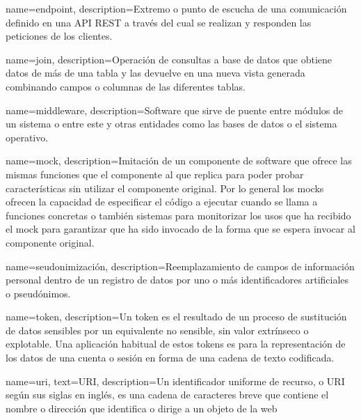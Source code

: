 {
    name=endpoint,
    description={Extremo o punto de escucha de una comunicación definido en una API REST a través del cual se realizan y responden las peticiones de los clientes.}
}

{
    name=join,
    description={Operación de consultas a base de datos que obtiene datos de más de una tabla y las devuelve en una nueva vista generada combinando campos o columnas de las diferentes tablas.}
}

{
    name=middleware,
    description={Software que sirve de puente entre módulos de un sistema o entre este y otras entidades como las bases de datos o el sistema operativo.}
}

{
    name=mock,
    description={Imitación de un componente de software que ofrece las mismas funciones que el componente al que replica para poder probar características sin utilizar el componente original. Por lo general los mocks ofrecen la capacidad de especificar el código a ejecutar cuando se llama a funciones concretas o también sistemas para monitorizar los usos que ha recibido el mock para garantizar que ha sido invocado de la forma que se espera invocar al componente original.}
}

{
    name=seudonimización,
    description=Reemplazamiento de campos de información personal dentro de un registro de datos por uno o más identificadores artificiales o pseudónimos.
}

{
    name=token,
    description={Un token es el resultado de un proceso de sustitución de datos sensibles por un equivalente no sensible, sin valor extrínseco o explotable. Una aplicación habitual de estos tokens es para la representación de los datos de una cuenta o sesión en forma de una cadena de texto codificada.}
}

{
    name=uri,
    text=URI,
    description={Un identificador uniforme de recurso, o URI según sus siglas en inglés, es una cadena de caracteres breve que contiene el nombre o dirección que identifica o dirige a un objeto de la web}
}

